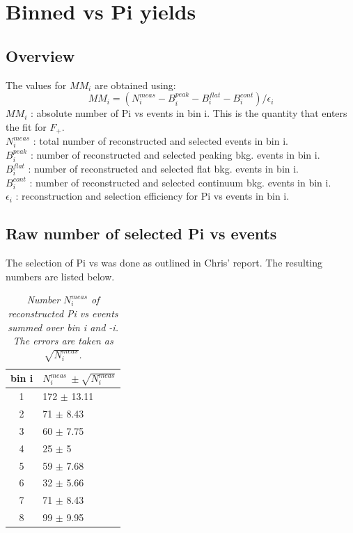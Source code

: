 \chapter{Binned \KlPiPi vs \4Pi yields }

\section{Overview}
The values for $MM_i$ are obtained using:
\begin{equation}
MM_i = (N_i^{meas} - B_i^{peak} - B_i^{flat} - B_i^{cont})/ \epsilon_i
\end{equation}
$MM_i$ : absolute number of \4Pi vs \KlPiPi events in bin i. This is the quantity that enters the fit for $F_+$.\\
$N_i^{meas}$ : total number of reconstructed and selected events in bin i. \\
$B_i^{peak}$ : number of reconstructed and selected peaking bkg. events in bin i.\\
$B_i^{flat}$ : number of reconstructed and selected flat bkg. events in bin i.\\
$B_i^{cont}$ : number of reconstructed and selected continuum bkg. events in bin i.\\
$\epsilon_i$ : reconstruction and selection efficiency for \4Pi vs \KlPiPi events in bin i. \\



\section{Raw number of selected \4Pi vs \KlPiPi events }
The selection of \4Pi vs \KlPiPi was done as outlined in Chris' report. The resulting numbers are listed below.\\
\begin{table}[!h]
	\begin{center}
	\begin{tabular}{c| l}
		bin i & $N^{meas}_i\ \pm \sqrt{N^{meas}_i}$  \\
		\hline 
		\hline
1 & 172 $\pm$ 13.11 \\ 
2 & 71 $\pm$ 8.43 \\ 
3 & 60 $\pm$ 7.75 \\ 
4 & 25 $\pm$ 5 \\ 
5 & 59 $\pm$ 7.68 \\ 
6 & 32 $\pm$ 5.66 \\ 
7 & 71 $\pm$ 8.43 \\ 
8 & 99 $\pm$ 9.95 \\ 
\end{tabular}
\end{center}
\caption{\textit{Number $N^{meas}_i$ of reconstructed \4Pi vs \KlPiPi events summed over bin i and -i. The errors are taken as $\sqrt{N^{meas}_i}$.}}
\end{table}


